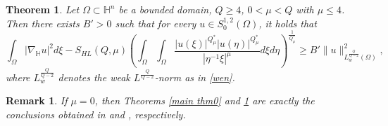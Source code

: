 \documentclass[11pt]{article}
\newtheorem{theorem}{Theorem}[section]
\newtheorem{remark}{Remark}[section]
\begin{document}
\begin{theorem}\label{main thm1}
Let $\Omega\subset \mathbb{H}^n$ be a bounded domain, $Q\geq 4$, $0<\mu< Q$ with $\mu\leq 4$.
 Then there exists $B'>0$ such that for every $u\in S_0^{1,2}(\Omega)$, it holds that
 \begin{equation*}
  \int_{\Omega}|\nabla_{\mathbb{H}} u|^{2}{d}\xi-S_{HL}(Q,\mu)	\left(\int_{\Omega}\int_{\Omega}\frac{|u(\xi)|^{Q^{\ast}_{\mu}}|u(\eta)|
^{Q^{\ast}_{\mu}}}{|\eta^{-1}\xi|^{\mu}}{d}\xi{d}\eta\right)^{\frac{1}{Q^{\ast}_{\mu}}}\geq B'  \|u\|_{L^{\frac{Q}{Q-2}}_w(\Omega)}^2,
\end{equation*}
where $L^{\frac{Q}{Q-2}}_w$ denotes the weak $L^{\frac{Q}{Q-2}}$-norm as in \eqref{wen}.
\end{theorem}


\begin{remark}
{\rm If $\mu=0$, then
Theorems \ref{main thm0} and \ref{main thm1} are exactly the conclusions obtained in \cite[Theorem 1.1]{L05} and \cite[Theorem 1.1]{L06}, respectively.
}
\end{remark}
\end{document}
